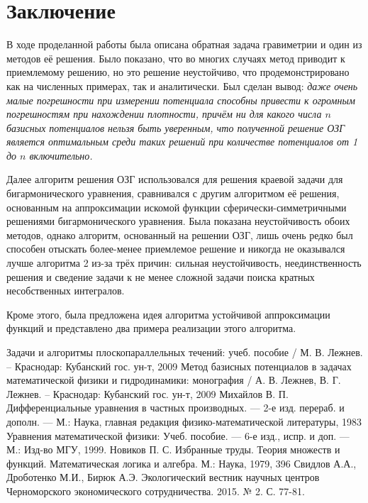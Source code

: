 \documentclass[a4paper, 12pt]{article}
\begin{document}
\section*{Заключение}
В ходе проделанной работы была описана обратная задача гравиметрии и один из методов её решения. Было показано,
что во многих случаях метод приводит к приемлемому решению, но это решение неустойчиво, что продемонстрировано как на численных примерах,
так и аналитически. Был сделан вывод:
{\it даже очень малые погрешности при измерении потенциала способны привести к огромным погрешностям при нахождении плотности, причём ни для какого числа $n$ базисных потенциалов нельзя быть уверенным, что полученной решение ОЗГ является оптимальным среди таких решений при количестве потенциалов от 1 до $n$ включительно.}

Далее алгоритм решения ОЗГ использовался для решения краевой задачи для бигармонического уравнения, сравнивался с другим алгоритмом её решения,
основанным на аппроксимации искомой функции сферически-симметричными решениями бигармонического уравнения.
Была показана неустойчивость обоих методов, однако алгоритм, основанный на решении ОЗГ, лишь очень редко был способен отыскать более-менее приемлемое решение и никогда не оказывался лучше алгоритма 2 из-за трёх причин: сильная неустойчивость, неединственность решения и сведение задачи к не менее сложной задачи поиска кратных несобственных интегралов.  

Кроме этого, была предложена идея алгоритма устойчивой аппроксимации функций и представлено два примера реализации этого алгоритма.

\begin{thebibliography}{15} 
  Задачи и алгоритмы плоскопараллельных течений: учеб. пособие / М. В. Лежнев. -- Краснодар: Кубанский гос. ун-т, 2009
  Метод базисных потенциалов в задачах математической физики и гидродинамики: монография / А. В. Лежнев, В. Г. Лежнев. -- Краснодар: Кубанский гос. ун-т, 2009
  Михайлов В. П. Дифференциальные уравнения в частных производных. --- 2-е изд. перераб. и дополн. --- М.: Наука, главная редакция физико-математической литературы, 1983
  Уравнения математической физики: Учеб. пособие. --- 6-е изд., испр. и доп. --- М.: Изд-во МГУ, 1999.
Новиков П. С. Избранные труды. Теория множеств и функций. Математическая логика и алгебра. М.: Наука, 1979, 396 
Свидлов А.А., Дроботенко М.И., Бирюк А.Э.
Экологический вестник научных центров Черноморского экономического сотрудничества. 2015. № 2. С. 77-81.

\end{thebibliography}
\end{document}

